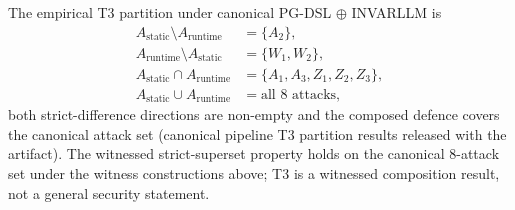 The empirical T3 partition under canonical PG-DSL $\oplus$ INVARLLM is
\begin{align*}
A_{\text{static}} \setminus A_{\text{runtime}} &= \{A_2\}, \\
A_{\text{runtime}} \setminus A_{\text{static}} &= \{W_1, W_2\}, \\
A_{\text{static}} \cap A_{\text{runtime}} &= \{A_1, A_3, Z_1, Z_2, Z_3\}, \\
A_{\text{static}} \cup A_{\text{runtime}} &= \text{all 8 attacks},
\end{align*}
both strict-difference directions are non-empty and the composed
defence covers the canonical attack set (canonical pipeline T3
partition results released with the artifact). The witnessed
strict-superset property holds on the canonical 8-attack set under
the witness constructions above; T3 is a witnessed composition
result, not a general security statement.

